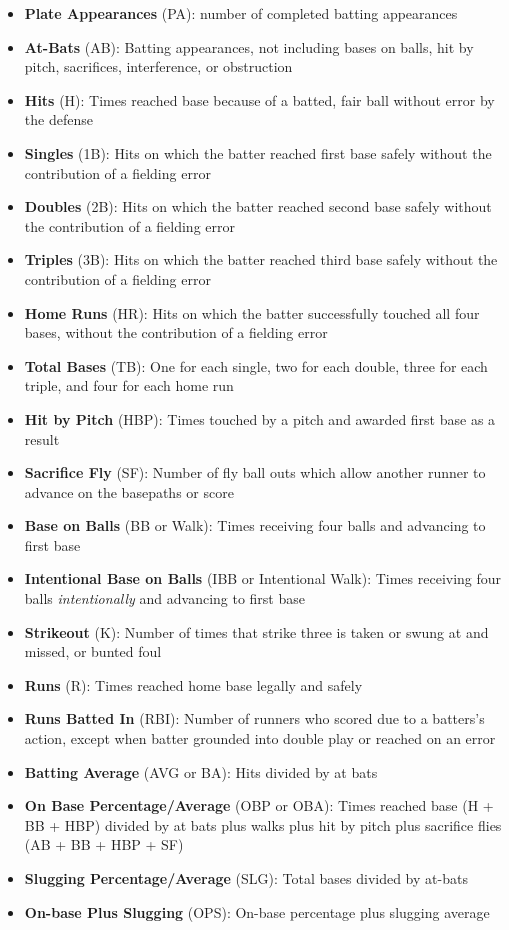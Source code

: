 \documentclass[
  11pt,
]{book}
\theoremstyle{definition}
\theoremstyle{definition}
\theoremstyle{definition}
\theoremstyle{definition}
\theoremstyle{remark}
\begin{document}
\begin{itemize}
\item
  \textbf{Plate Appearances} (PA): number of completed batting appearances
\item
  \textbf{At-Bats} (AB): Batting appearances, not including bases on balls, hit by pitch, sacrifices, interference, or obstruction
\item
  \textbf{Hits} (H): Times reached base because of a batted, fair ball without error by the defense
\item
  \textbf{Singles} (1B): Hits on which the batter reached first base safely without the contribution of a fielding error
\item
  \textbf{Doubles} (2B): Hits on which the batter reached second base safely without the contribution of a fielding error
\item
  \textbf{Triples} (3B): Hits on which the batter reached third base safely without the contribution of a fielding error
\item
  \textbf{Home Runs} (HR): Hits on which the batter successfully touched all four bases, without the contribution of a fielding error
\item
  \textbf{Total Bases} (TB): One for each single, two for each double, three for each triple, and four for each home run
\item
  \textbf{Hit by Pitch} (HBP): Times touched by a pitch and awarded first base as a result
\item
  \textbf{Sacrifice Fly} (SF): Number of fly ball outs which allow another runner to advance on the basepaths or score
\item
  \textbf{Base on Balls} (BB or Walk): Times receiving four balls and advancing to first base
\item
  \textbf{Intentional Base on Balls} (IBB or Intentional Walk): Times receiving four balls \emph{intentionally} and advancing to first base
\item
  \textbf{Strikeout} (K): Number of times that strike three is taken or swung at and missed, or bunted foul
\item
  \textbf{Runs} (R): Times reached home base legally and safely
\item
  \textbf{Runs Batted In} (RBI): Number of runners who scored due to a batters's action, except when batter grounded into double play or reached on an error
\item
  \textbf{Batting Average} (AVG or BA): Hits divided by at bats
\item
  \textbf{On Base Percentage/Average} (OBP or OBA): Times reached base (H + BB + HBP) divided by at bats plus walks plus hit by pitch plus sacrifice flies (AB + BB + HBP + SF)
\item
  \textbf{Slugging Percentage/Average} (SLG): Total bases divided by at-bats
\item
  \textbf{On-base Plus Slugging} (OPS): On-base percentage plus slugging average
\end{itemize}
\end{document}
